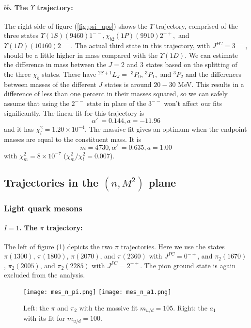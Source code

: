 \documentclass[11pt,a4]{article}
\newcommand{\alp}{\ensuremath{\alpha'\:}}
\newcommand{\bbb}{b\bar{b}}
\newcommand{\rchi}[1]{\ensuremath{\chi^2_m/\chi^2_l = #1}}
\newcommand{\ten}[1]{\times10^{#1}}
\newcommand{\mud}{m_{u/d}}
\begin{document}
				\paragraph{\(\bbb\). The \(\Upsilon\) trajectory:} The right side of figure (\ref{fig:psi_ups}) shows the \(\Upsilon\) trajectory, comprised of the three states \(\Upsilon(1S)(9460)1^{--}, \chi_{b2}(1P)(9910)2^{++},\) and \(\Upsilon(1D)(10160)2^{--}\). The actual third state in this trajectory, with \(J^{PC} = 3^{--}\), should be a little higher in mass compared with the \(\Upsilon(1D)\). We can estimate the difference in mass between the \(J = 2\) and \(3\) states based on the splitting of the three \(\chi_b\) states. These have \(^{2S+1}\! L_J =\) \(^3P_0\), \(^3P_1,\) and \(^3P_2\) and the differences between masses of the different \(J\) states is around \(20-30\) MeV. This results in a difference of less than one percent in their masses squared, so we can safely assume that using the \(2^{--}\) state in place of the \(3^{--}\) won't affect our fits significantly.
				The linear fit for this trajectory is
				\[ \alp = 0.144, a = -11.96 \]
				and it has \(\chi^2_l = 1.20\ten{-4}\). The massive fit gives an optimum when the endpoint masses are equal to the constituent mass. It is
				\[ m = 4730, \alp = 0.635, a = 1.00 \]
				with \(\chi^2_m = 8\ten{-7}\) (\rchi{0.007}).
				
		\subsection{Trajectories in the \texorpdfstring{$(n,M^2)$}{(n,M2)} plane}
			\subsubsection{Light quark mesons}
				\paragraph{\(I = 1\). The \(\pi\) trajectory:} The left of figure (\ref{fig:pi_a1}) depicts the two \(\pi\) trajectories. Here we use the states \(\pi(1300)\), \(\pi(1800)\), \(\pi(2070)\), and \(\pi(2360)\) with \(J^{PC} = 0^{-+}\), and \(\pi_2(1670)\), \(\pi_2(2005)\), and \(\pi_2(2285)\) with \(J^{PC} = 2^{-+}\). The pion ground state is again excluded from the analysis.

		\begin{figure}[tbp] \centering
						\texttt{[image: mes\_n\_pi.png]}	 \hfill
						\texttt{[image: mes\_n\_a1.png]}
						\caption{\label{fig:pi_a1} Left: the \(\pi\) and \(\pi_2\) with the massive fit \(\mud = 105\). Right: the \(a_1\) with its fit for \(\mud = 100\).}
				\end{figure}
				
\end{document}
